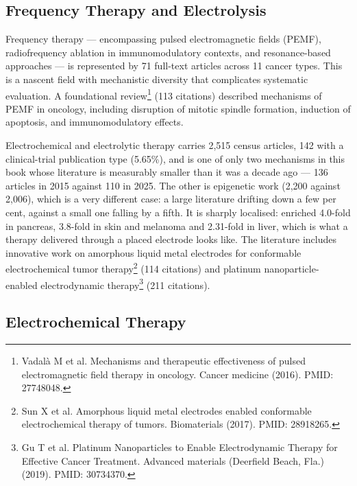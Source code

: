 \documentclass[11pt,twoside,openright]{report}
\begin{document}
\subsection{Frequency Therapy and Electrolysis}

Frequency therapy --- encompassing pulsed electromagnetic fields (PEMF), radiofrequency ablation in immunomodulatory contexts, and resonance-based approaches --- is represented by 71 full-text articles across 11 cancer types. This is a nascent field with mechanistic diversity that complicates systematic evaluation. A foundational review\footnote{Vadalà M et al. Mechanisms and therapeutic effectiveness of pulsed electromagnetic field therapy in oncology. Cancer medicine (2016). PMID: 27748048.} (113 citations) described mechanisms of PEMF in oncology, including disruption of mitotic spindle formation, induction of apoptosis, and immunomodulatory effects.

Electrochemical and electrolytic therapy carries 2,515 census articles, 142 with a clinical-trial publication type (5.65\%), and is one of only two mechanisms in this book whose literature is measurably smaller than it was a decade ago --- 136 articles in 2015 against 110 in 2025. The other is epigenetic work (2,200 against 2,006), which is a very different case: a large literature drifting down a few per cent, against a small one falling by a fifth. It is sharply localised: enriched 4.0-fold in pancreas, 3.8-fold in skin and melanoma and 2.31-fold in liver, which is what a therapy delivered through a placed electrode looks like. The literature includes innovative work on amorphous liquid metal electrodes for conformable electrochemical tumor therapy\footnote{Sun X et al. Amorphous liquid metal electrodes enabled conformable electrochemical therapy of tumors. Biomaterials (2017). PMID: 28918265.} (114 citations) and platinum nanoparticle-enabled electrodynamic therapy\footnote{Gu T et al. Platinum Nanoparticles to Enable Electrodynamic Therapy for Effective Cancer Treatment. Advanced materials (Deerfield Beach, Fla.) (2019). PMID: 30734370.} (211 citations).

\subsection{Electrochemical Therapy}
\end{document}
